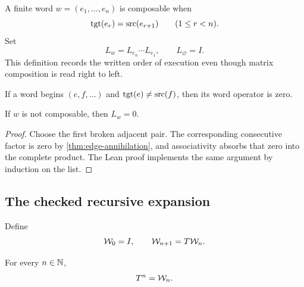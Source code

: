 \begin{definition}
\label{def:word-op}
A finite word $w=(e_1,\ldots,e_n)$ is composable when
\[
  \operatorname{tgt}(e_r)=\operatorname{src}(e_{r+1})
  \qquad (1\le r<n).
\]
Set
\[
  L_w=L_{e_n}\cdots L_{e_1},
  \qquad L_{\varnothing}=I.
\]
This definition records the written order of execution even though matrix
composition is read right to left.
\end{definition}

\begin{theorem}
\label{thm:first-break}
If a word begins $(e,f,\ldots)$ and $\operatorname{tgt}(e)\ne\operatorname{src}(f)$, then its word
operator is zero.
\end{theorem}

\begin{theorem}
\label{thm:nonwalk-vanish}
If $w$ is not composable, then $L_w=0$.
\end{theorem}

\begin{proof}
Choose the first broken adjacent pair.  The corresponding consecutive factor
is zero by \cref{thm:edge-annihilation}, and associativity absorbs that zero
into the complete product.  The Lean proof implements the same argument by
induction on the list.
\end{proof}

\subsection{The checked recursive expansion}

\begin{definition}
\label{def:recursive-word-expansion}
Define
\[
  \mathcal W_0=I,
  \qquad
  \mathcal W_{n+1}=T\mathcal W_n.
\]
\end{definition}

\begin{theorem}
\label{thm:power-recursive-expansion}
For every $n\in\mathbb N$,
\[
  T^n=\mathcal W_n.
\]
\end{theorem}

